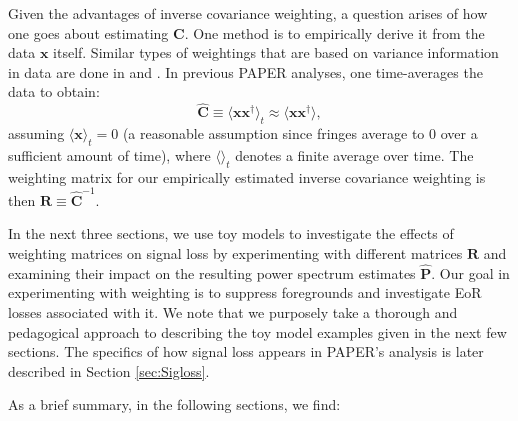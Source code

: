 \documentclass[preprint2,numberedappendix,tighten]{aastex6}  %
\newcommand{\C}{\mathbf{C}}
\begin{document}
Given the advantages of inverse covariance weighting, a question arises of how one goes about estimating $\C$.  One method is to empirically derive it from the data $\textbf{x}$ itself.
Similar types of weightings that are based on variance information in data are done in \citet{chang_et_al2010} and \citet{switzer_et_al2015}. In previous PAPER analyses, one time-averages the data to obtain:
\begin{equation}
\widehat{\textbf{C}} \equiv \langle\textbf{xx}^{\dagger}\rangle_{t} \approx \langle  \textbf{xx}^{\dagger}\rangle,
\end{equation}
assuming $\langle\textbf{x}\rangle_{t} = 0$ (a reasonable assumption since fringes average to $0$ over a sufficient 
amount of time), where $\langle \rangle_{t}$ denotes a finite average over time. The weighting matrix for our empirically estimated inverse covariance weighting is then $
\textbf{R} \equiv \widehat{\textbf{C}}^{-1}$.

In the next three sections, we use toy models to investigate the effects of weighting matrices on signal loss by experimenting with different matrices $\textbf{R}$ and examining their impact on the resulting power spectrum estimates $\widehat{\textbf{P}}$. Our goal in experimenting with weighting is to suppress foregrounds and investigate EoR losses associated with it. We note that we purposely take a thorough and pedagogical approach to describing the toy model examples given in the next few sections. The specifics of how signal loss appears in PAPER's analysis is later described in Section \ref{sec:Sigloss}.


As a brief summary, in the following sections, we find:
\end{document}
